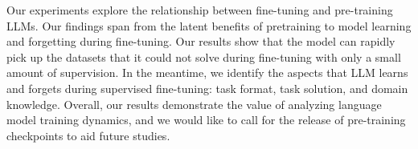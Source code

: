 Our experiments explore the relationship between fine-tuning and pre-training LLMs.
Our findings span from the latent benefits of pretraining to model learning and forgetting during fine-tuning.
Our results show that the model can rapidly pick up the datasets that it could not solve during fine-tuning with only a small amount of supervision.
In the meantime, we identify the aspects that LLM learns and forgets during supervised fine-tuning: task format, task solution, and domain knowledge.
Overall, our results demonstrate the value of analyzing language model training dynamics, and we would like to call for the release of pre-training checkpoints to aid future studies.